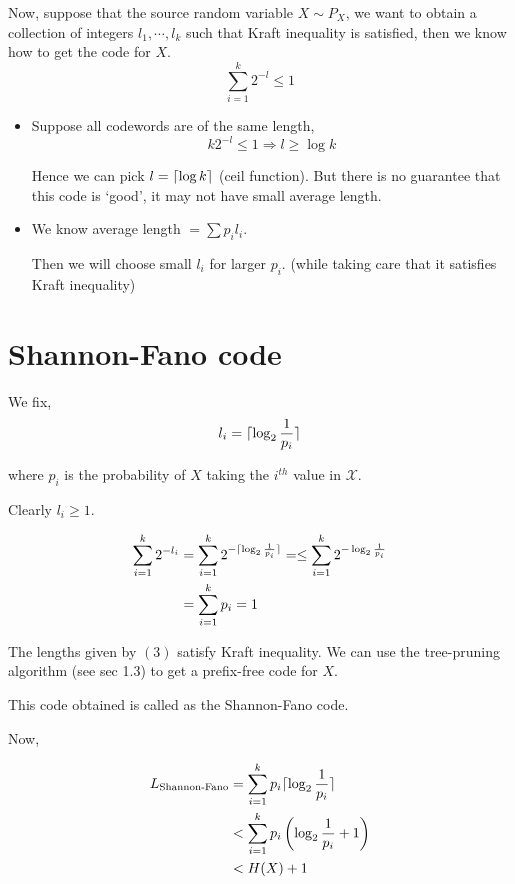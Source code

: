 \documentclass{article}
\DeclarePairedDelimiter{\ceil}{\lceil}{\rceil}
\begin{document}
Now, suppose that the source random variable $X \sim P_X$, we want to obtain a collection of integers $l_1, \cdots, l_k$ such that Kraft inequality is satisfied, then we know how to get the code for $X$.
$$ \sum_{i=1}^{k} 2^{-l} \leq 1$$
\begin{itemize}
    \item Suppose all codewords are of the same length, $$ k 2^{-l} \leq 1 \Rightarrow l \geq \log k$$

    Hence we can pick $l = \ceil{\log k}$ (ceil function). But there is no guarantee that this code is `good', it may not have small average length.

    \item We know average length $= \sum p_i l_i$.

    Then we will choose small $l_i$ for larger $p_i$. (while taking care that it satisfies Kraft inequality)
\end{itemize}

\section{Shannon-Fano code}

We fix,
\begin{equation}
    l_i = \ceil{ \log_2 \frac{1}{p_i}}
\end{equation}

 where $p_i$ is the probability of $X$ taking the $i^{th}$ value in $\mathcal{X}$.

Clearly $l_i \geq 1$.

\begin{align*}
    \sum_{i=1}^k 2^{-l_i} &= \sum_{i=1}^k 2^{-\ceil{\log_2 \frac{1}{p_i}}}  =\leq \sum_{i=1}^{k} 2^{- \log_2 \frac{1}{p_i}} \\
    &= \sum_{i=1}^k p_i = 1
\end{align*}

The lengths given by $(3)$ satisfy Kraft inequality. We can use the tree-pruning algorithm (see sec 1.3) to get a prefix-free code for $X$.

This code obtained is called as the Shannon-Fano code.

Now,

\begin{align*}
    L_{\text{Shannon-Fano}} &= \sum_{i=1}^{k} p_i \ceil{\log_2 \frac{1}{p_i}} \\
    &< \sum_{i=1}^{k} p_i \left( \log_2 \frac{1}{p_i} +1 \right) \\
    &< H(X)+1
\end{align*}
\end{document}
